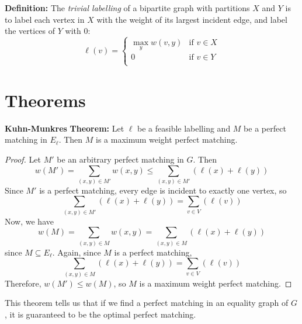 \documentclass[12pt]{article}
\newcommand{\defn}{\noindent \textbf{Definition: }}
\newcommand{\thm}{\noindent \textbf{Theorem: }}
\newcommand{\lskip}{\vspace{\baselineskip}}
\begin{document}
\defn The \emph{trivial labelling} of a bipartite graph with partitions $X$ and $Y$ is to label each vertex in $X$ with the weight of its largest incident edge, and label the vertices of $Y$ with 0:
\[ \ell(v) =
  \begin{cases}
    \max_{y} w(v,y) & \text{if } v \in X \\
    0 & \text{if } v \in Y \\
  \end{cases}
\]

\section*{Theorems}

\textbf{Kuhn-Munkres} \thm Let $\ell$ be a feasible labelling and $M$ be a perfect matching in $E_\ell$. Then $M$ is a maximum weight perfect matching.

\begin{proof}
  Let $M'$ be an arbitrary perfect matching in $G$. Then
  \[ w(M') = \sum_{(x,y) \in M'} w(x,y) \leq \sum_{(x,y) \in M'}(\ell(x) + \ell(y)) \]
  Since $M'$ is a perfect matching, every edge is incident to exactly one vertex, so \[ \sum_{(x,y) \in M'}(\ell(x) + \ell(y)) = \sum_{v \in V}(\ell(v)) \]
  Now, we have
  \[ w(M) = \sum_{(x,y) \in M} w(x,y) = \sum_{(x,y) \in M}(\ell(x) + \ell(y)) \]
  since $M \subseteq E_\ell$.
  Again, since $M$ is a perfect matching,
  \[ \sum_{(x,y) \in M}(\ell(x) + \ell(y)) = \sum_{v \in V}(\ell(v)) \]
  Therefore, $w(M') \leq w(M)$, so $M$ is a maximum weight perfect matching.
\end{proof}

This theorem tells us that if we find a perfect matching in an equality graph of $G$, it is guaranteed to be the optimal perfect matching.\lskip
\lskip
\end{document}
